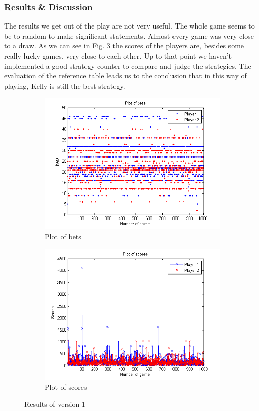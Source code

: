 \documentclass[11pt]{article}
\begin{document}
\subsubsection{Results \& Discussion}
The results we get out of the play are not very useful. The whole game seems to be to random to make significant statements. Almost every game was very close to a draw. As we can see in Fig. \ref{Results 1} the scores of the players are, besides some really lucky games, very close to each other. Up to that point we haven't implemented a good strategy counter to compare and judge the strategies.
The evaluation of the reference table leads us to the conclusion that in this way of playing, Kelly is still the best strategy.
\begin{figure}[h]
		\centering
		\begin{subfigure}[b]{0.4\textwidth}
                \includegraphics[width=\textwidth]{plot_of_bets_V1}
                \caption{Plot of bets}
                \label{bets 1}
        \end{subfigure}
        \begin{subfigure}[b]{0.4\textwidth}
                \includegraphics[width=\textwidth]{plot_of_scores_V1}
                \caption{Plot of scores}
                \label{scores 1}
        \end{subfigure}
        \caption{Results of version 1}
        \label{Results 1}
\end{figure}
\end{document}
